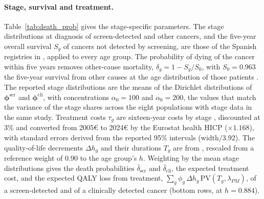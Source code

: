 \documentclass[12pt]{article}
\begin{document}
\paragraph{Stage, survival and treatment.} Table~\ref{tab:death_prob} gives the stage-specific parameters. The stage distributions at diagnosis of screen-detected and other cancers, and the five-year overall survival $S_g$ of cancers not detected by screening, are those of the Spanish registries in \citet{cardoso2022overall}, applied to every age group. The probability of dying of the cancer within five years removes other-cause mortality, $\delta_g = 1 - S_g/S_0$, with $S_0 = 0.963$ the five-year survival from other causes at the age distribution of those patients \citep{ine2024mortalidad}. The reported stage distributions are the means of the Dirichlet distributions of $\boldsymbol{\phi}^{\text{scr}}$ and $\boldsymbol{\phi}^{\text{cli}}$, with concentrations $\alpha_0 = 100$ and $\alpha_0 = 200$, the values that match the variance of the stage shares across the eight populations with stage data in the same study. Treatment costs $\tau_g$ are sixteen-year costs by stage \citep{corral2015estimation}, discounted at 3\% and converted from 2005€ to 2024€ by the Eurostat health HICP ($\times 1.168$), with standard errors derived from the reported 95\% intervals (width$/3.92$). The quality-of-life decrements $\Delta h_g$ and their durations $T_g$ are from \citet{djalalov2014review}, rescaled from a reference weight of $0.90$ to the age group's $h$. Weighting by the mean stage distributions gives the death probabilities $\bar\delta_{\text{scr}}$ and $\bar\delta_{\text{cli}}$, the expected treatment cost, and the expected QALY loss from treatment, $\sum_g \phi_g\, \Delta h_g\, \mathrm{PV}(T_g, \lambda_{PM})$, of a screen-detected and of a clinically detected cancer (bottom rows, at $h = 0.884$).
\end{document}
